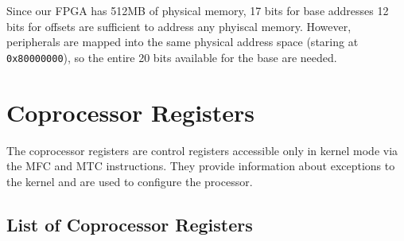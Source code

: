 \documentclass[11pt,openany]{report}
\begin{document}
Since our FPGA has 512MB of physical memory, 17 bits for base addresses 12 bits for offsets are sufficient to address any phyiscal memory. However, peripherals are mapped into the same physical address space (staring at \texttt{0x80000000}), so the entire 20 bits available for the base are needed.

\section{Coprocessor Registers}
\label{sec:cpregs}

The coprocessor registers are control registers accessible only in kernel mode via the MFC and MTC instructions. They provide information about exceptions to the kernel and are used to configure the processor. 

\subsection{List of Coprocessor Registers}
\end{document}
